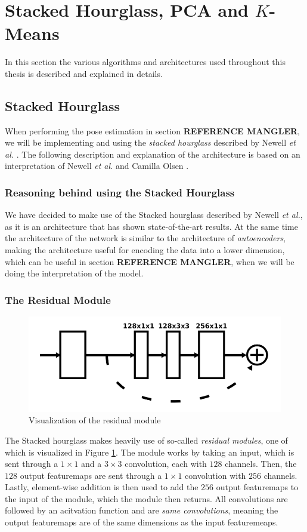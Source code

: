 \documentclass[./main.tex]{subfiles}
\begin{document}
\section{Stacked Hourglass, PCA and $K$-Means}
In this section the various algorithms and architectures used throughout this thesis is described and explained in details.
\subsection{Stacked Hourglass}
When performing the pose estimation in section \textbf{REFERENCE MANGLER}, we will be implementing and using the \textit{stacked hourglass} described by Newell \textit{et al.} \cite{Newell}. The following description and explanation of the architecture is based on an interpretation of Newell \textit{et al.} \cite{Newell} and Camilla Olsen \cite{Camilla}.

\subsubsection{Reasoning behind using the Stacked Hourglass}
We have decided to make use of the Stacked hourglass described by Newell \textit{et al.}, as it is an architecture that has shown state-of-the-art results. At the same time the architecture of the network is similar to the architecture of \textit{autoencoders}, making the architecture useful for encoding the data into a lower dimension, which can be useful in section \textbf{REFERENCE MANGLER}, when we will be doing the interpretation of the model.

\subsubsection{The Residual Module}
\begin{figure}[h]
    \centering
    \includegraphics[height = 2 cm]{entities/Residual.png}
    \caption{Visualization of the residual module \cite{Newell}}
    \label{fig:residual}
\end{figure}
\noindent The Stacked hourglass makes heavily use of so-called \textit{residual modules}, one of which is visualized in Figure \ref{fig:residual}. The module works by taking an input, which is sent through a $1 \times 1$ and a $3 \times 3$ convolution, each with $128$ channels. Then, the $128$ output featuremaps are sent through a $1 \times 1$ convolution with $256$ channels. Lastly, element-wise addition is then used to add the $256$ output featuremaps to the input of the module, which the module then returns. All convolutions are followed by an acitvation function and are \textit{same convolutions}, meaning the output featuremaps are of the same dimensions as the input featuremeaps.
\end{document}
